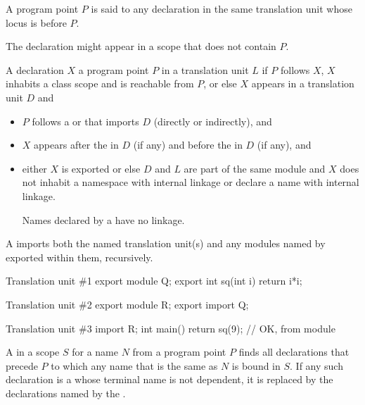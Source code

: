 A program point $P$ is said to 
any declaration in the same translation unit
whose locus is before $P$.
\begin{note}
The declaration might appear in a scope that does not contain $P$.
\end{note}
%
A declaration $X$ 
a program point $P$ in a translation unit $L$
if $P$ follows $X$, $X$ inhabits a class scope and is reachable from $P$, or
else $X$ appears in a translation unit $D$ and
\begin{itemize}
\item
$P$ follows
a  or 
that imports $D$ (directly or indirectly), and
\item
$X$ appears after the  in $D$ (if any) and
before the  in $D$ (if any), and
\item
either $X$ is exported or else $D$ and $L$ are part of the same module and
$X$ does not inhabit a namespace with internal linkage or
declare a name with internal linkage.
\begin{note}
Names declared by a  have no linkage.
\end{note}
\end{itemize}
\begin{note}
A  imports both
the named translation unit(s) and
any modules named by exported
 within them,
recursively.
\begin{example}
\begin{codeblocktu}{Translation unit \#1}
export module Q;
export int sq(int i) { return i*i; }
\end{codeblocktu}

\begin{codeblocktu}{Translation unit \#2}
export module R;
export import Q;
\end{codeblocktu}

\begin{codeblocktu}{Translation unit \#3}
import R;
int main() { return sq(9); }    // OK,  from module 
\end{codeblocktu}
\end{example}
\end{note}

\pnum
{}%
A  in a scope $S$
for a name $N$ from a program point $P$
finds all declarations that precede $P$
to which any name that is the same as $N$ is bound in $S$.
If any such declaration is a 
whose terminal name
is not dependent,
it is replaced by the declarations named by
the .

